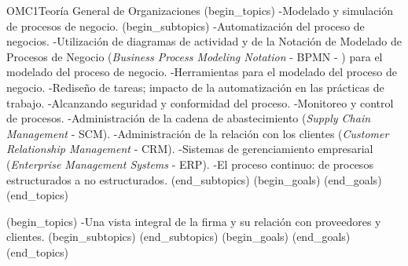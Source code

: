 \begin{BKL2}{OMC1}{Teorí­a General de Organizaciones}
(begin_topics)
-Modelado y simulación de procesos de negocio.
(begin_subtopics)
-Automatización del proceso de negocios.
-Utilización de diagramas de actividad y de la Notación de Modelado de Procesos de Negocio (\emph{Business Process Modeling Notation} - BPMN - ) para el modelado del proceso de negocio.
-Herramientas para el modelado del proceso de negocio.
-Rediseño de tareas; impacto de la automatización en las prácticas de trabajo.
-Alcanzando seguridad y conformidad del proceso.
-Monitoreo y control de procesos.
-Administración de la cadena de abastecimiento (\emph{Supply Chain Management} - SCM). 
-Administración de la relación con los clientes (\emph{Customer Relationship Management} - CRM).
-Sistemas de gerenciamiento empresarial (\emph{Enterprise Management Systems} - ERP).
-El proceso continuo: de procesos estructurados a no estructurados.
(end_subtopics)
(begin_goals)
(end_goals)
(end_topics)

(begin_topics)
-Una vista integral de la firma y su relación con proveedores y clientes.
(begin_subtopics)
(end_subtopics)
(begin_goals)
(end_goals)
(end_topics)

\end{BKL2}



